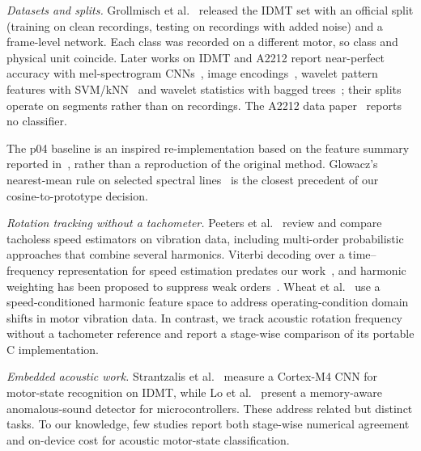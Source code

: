 \documentclass[conference]{IEEEtran}
\newif\ifwip
\begin{document}
\emph{Datasets and splits.} Grollmisch et al.~\cite{grollmisch2019} released the IDMT set with
an official split (training on clean recordings, testing on recordings with added noise) and a
frame-level network. Each class was recorded on a different motor, so class and physical unit
coincide. Later works on IDMT and A2212 report near-perfect accuracy with mel-spectrogram
CNNs~\cite{melcnn2025}, image encodings~\cite{ertarin2025}, wavelet pattern features with
SVM/kNN~\cite{etnext2026} and wavelet statistics with bagged trees~\cite{tekin2025}; their splits
operate on segments rather than on recordings. The A2212 data paper~\cite{estacio2023} reports
no classifier.
\ifwip\else
The p04 baseline is an inspired re-implementation based on the feature summary reported
in~\cite{vanaraj2026}, rather than a reproduction of the original method. Glowacz's nearest-mean
rule on selected spectral lines~\cite{glowacz2018} is the closest precedent of our
cosine-to-prototype decision.
\fi

\ifwip
\emph{Rotation tracking without a tachometer} has been reviewed on vibration
data~\cite{peeters2019}, and Viterbi decoding over a time--frequency representation predates our
work~\cite{xi2015}; we provide a stage-wise comparison of a portable C implementation on
microphone audio.
\else
\emph{Rotation tracking without a tachometer.} Peeters et al.~\cite{peeters2019} review and
compare tacholess speed estimators on vibration data, including multi-order probabilistic
approaches that combine several harmonics. Viterbi decoding over a time--frequency
representation for speed estimation predates our work~\cite{xi2015}, and harmonic weighting has
been proposed to suppress weak orders~\cite{yoo2023}. Wheat et al.~\cite{wheat2025} use a
speed-conditioned harmonic feature space to address operating-condition domain shifts in motor
vibration data. In contrast, we track acoustic rotation frequency without a tachometer reference
and report a stage-wise comparison of its portable C implementation.
\fi

\ifwip\else
\emph{Embedded acoustic work.} Strantzalis et al.~\cite{strantzalis2022} measure a Cortex-M4 CNN
for motor-state recognition on IDMT, while Lo et al.~\cite{lo2024} present a memory-aware
anomalous-sound detector for microcontrollers. These address related but distinct tasks. To our
knowledge, few studies report both stage-wise numerical agreement and on-device cost for acoustic
motor-state classification.
\fi

\end{document}

